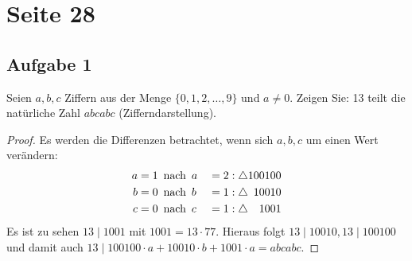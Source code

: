 \section{Seite 28}

\subsection{Aufgabe 1}
Seien $a,b,c$ Ziffern aus der Menge $\{0,1,2,\dotsc,9\}$ und $a \neq 0$.
Zeigen Sie: 13 teilt die natürliche Zahl $abcabc$ (Zifferndarstellung).
\begin{proof}
  Es werden die Differenzen betrachtet, wenn sich $a, b, c$ um einen Wert verändern:
  \begin{alignat*}{2}
    a & = 1 \enspace\text{nach}\enspace a &  & = 2 : \triangle 100100            \\
    b & = 0 \enspace\text{nach}\enspace b &  & = 1 : \triangle \hphantom{0}10010 \\
    c & = 0 \enspace\text{nach}\enspace c &  & = 1 : \triangle \hphantom{00}1001
  \end{alignat*}
  Es ist zu sehen $13 \mid 1001$ mit $1001 = 13 \cdot 77$.
  Hieraus folgt $13 \mid 10010, 13 \mid 100100$ und damit auch
  $13 \mid 100100 \cdot a + 10010 \cdot b + 1001 \cdot a = abcabc$.
\end{proof}

\newpage
